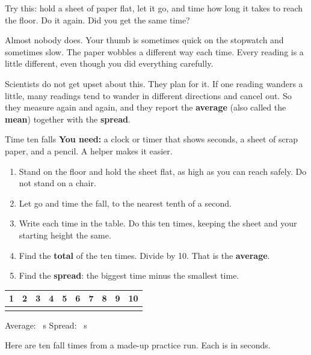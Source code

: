 \label{ch4}

Try this: hold a sheet of paper flat, let it go, and time how long it takes to reach the floor. Do it again. Did you get the same time?

Almost nobody does. Your thumb is sometimes quick on the stopwatch and sometimes slow. The paper wobbles a different way each time. Every reading is a little different, even though you did everything carefully.

Scientists do not get upset about this. They plan for it. If one reading wanders a little, many readings tend to wander in different directions and cancel out. So they measure again and again, and they report the \textbf{average} (also called the \textbf{mean}) together with the \textbf{spread}.

\begin{tryit}{Time ten falls}
\textbf{You need:} a clock or timer that shows seconds, a sheet of scrap paper, and a pencil. A helper makes it easier.
\begin{enumerate}[leftmargin=1.6em]
\item Stand on the floor and hold the sheet flat, as high as you can reach safely. Do not stand on a chair.
\item Let go and time the fall, to the nearest tenth of a second.
\item Write each time in the table. Do this ten times, keeping the sheet and your starting height the same.
\item Find the \textbf{total} of the ten times. Divide by 10. That is the \textbf{average}.
\item Find the \textbf{spread}: the biggest time minus the smallest time.
\end{enumerate}
\medskip
\renewcommand{\arraystretch}{1.5}
\begin{tabular}{|c|c|c|c|c|c|c|c|c|c|}
\hline
\textbf{1}&\textbf{2}&\textbf{3}&\textbf{4}&\textbf{5}&\textbf{6}&\textbf{7}&\textbf{8}&\textbf{9}&\textbf{10}\\ \hline
\rule{0pt}{0.9cm}&&&&&&&&&\\ \hline
\end{tabular}
\medskip

Average: \wline[1.8cm]~s \qquad Spread: \wline[1.8cm]~s
\end{tryit}

Here are ten fall times from a made-up practice run. Each is in seconds.

